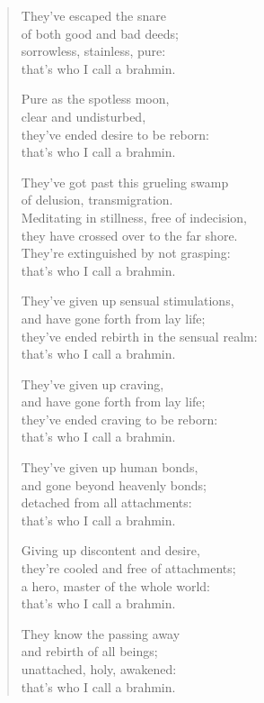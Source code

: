 \documentclass[12pt,openany]{book}%
\begin{document}
\begin{verse}
They’ve escaped the snare \\
of both good and bad deeds; \\
sorrowless, stainless, pure: \\
that’s who I call a brahmin. 

Pure as the spotless moon, \\
clear and undisturbed, \\
they’ve ended desire to be reborn: \\
that’s who I call a brahmin. 

They’ve got past this grueling swamp \\
of delusion, transmigration. \\
Meditating in stillness, free of indecision, \\
they have crossed over to the far shore. \\
They’re extinguished by not grasping: \\
that’s who I call a brahmin. 

They’ve given up sensual stimulations, \\
and have gone forth from lay life; \\
they’ve ended rebirth in the sensual realm: \\
that’s who I call a brahmin. 

They’ve given up craving, \\
and have gone forth from lay life; \\
they’ve ended craving to be reborn: \\
that’s who I call a brahmin. 

They’ve given up human bonds, \\
and gone beyond heavenly bonds; \\
detached from all attachments: \\
that’s who I call a brahmin. 

Giving up discontent and desire, \\
they’re cooled and free of attachments; \\
a hero, master of the whole world: \\
that’s who I call a brahmin. 

They know the passing away \\
and rebirth of all beings; \\
unattached, holy, awakened: \\
that’s who I call a brahmin. 


\end{verse}
\end{document}
